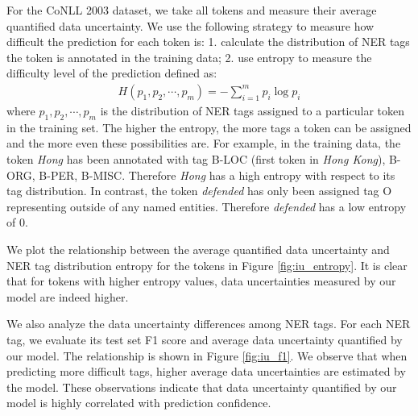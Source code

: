\documentclass[letterpaper]{article} %
\begin{document}
For the CoNLL 2003 dataset, we take all tokens and measure their average quantified data uncertainty. We use the following strategy to measure how difficult the prediction for each token is: 1. calculate the distribution of NER tags the token is annotated in the training data; 2. use entropy to measure the difficulty level of the prediction defined as:
\begin{align}
H(p_1,p_2,\cdots,p_m)=-\sum_{i=1}^mp_i\log{p_i}
\end{align}
where $p_1, p_2, \cdots, p_m$ is the distribution of NER tags assigned to a particular token in the training set. The higher the entropy, the more tags a token can be assigned and the more even these possibilities are. For example, in the training data, the token \textit{Hong} has been annotated with tag B-LOC (first token in \textit{Hong Kong}), B-ORG, B-PER, B-MISC. Therefore \textit{Hong} has a high entropy with respect to its tag distribution. In contrast, the token \textit{defended} has only been assigned tag O representing outside of any named entities. Therefore \textit{defended} has a low entropy of $0$.

We plot the relationship between the average quantified data uncertainty and NER tag distribution entropy for the tokens in Figure \ref{fig:iu_entropy}. It is clear that for tokens with higher entropy values, data uncertainties measured by our model are indeed higher.

We also analyze the data uncertainty differences among NER tags. For each NER tag, we evaluate its test set F1 score and average data uncertainty quantified by our model. The relationship is shown in Figure \ref{fig:iu_f1}. We observe that when predicting more difficult tags, higher average data uncertainties are estimated by the model. These observations indicate that data uncertainty quantified by our model is highly correlated with prediction confidence.
\end{document}
